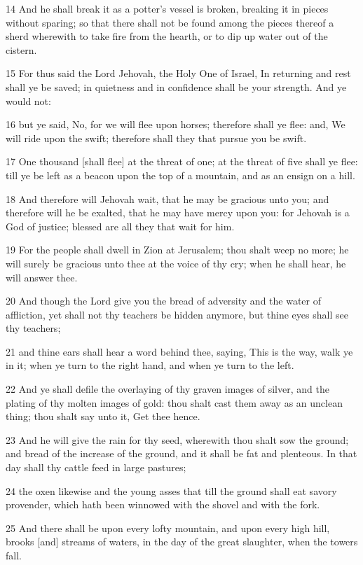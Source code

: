 \par 14 And he shall break it as a potter's vessel is broken, breaking it in pieces without sparing; so that there shall not be found among the pieces thereof a sherd wherewith to take fire from the hearth, or to dip up water out of the cistern.
\par 15 For thus said the Lord Jehovah, the Holy One of Israel, In returning and rest shall ye be saved; in quietness and in confidence shall be your strength. And ye would not:
\par 16 but ye said, No, for we will flee upon horses; therefore shall ye flee: and, We will ride upon the swift; therefore shall they that pursue you be swift.
\par 17 One thousand [shall flee] at the threat of one; at the threat of five shall ye flee: till ye be left as a beacon upon the top of a mountain, and as an ensign on a hill.
\par 18 And therefore will Jehovah wait, that he may be gracious unto you; and therefore will he be exalted, that he may have mercy upon you: for Jehovah is a God of justice; blessed are all they that wait for him.
\par 19 For the people shall dwell in Zion at Jerusalem; thou shalt weep no more; he will surely be gracious unto thee at the voice of thy cry; when he shall hear, he will answer thee.
\par 20 And though the Lord give you the bread of adversity and the water of affliction, yet shall not thy teachers be hidden anymore, but thine eyes shall see thy teachers;
\par 21 and thine ears shall hear a word behind thee, saying, This is the way, walk ye in it; when ye turn to the right hand, and when ye turn to the left.
\par 22 And ye shall defile the overlaying of thy graven images of silver, and the plating of thy molten images of gold: thou shalt cast them away as an unclean thing; thou shalt say unto it, Get thee hence.
\par 23 And he will give the rain for thy seed, wherewith thou shalt sow the ground; and bread of the increase of the ground, and it shall be fat and plenteous. In that day shall thy cattle feed in large pastures;
\par 24 the oxen likewise and the young asses that till the ground shall eat savory provender, which hath been winnowed with the shovel and with the fork.
\par 25 And there shall be upon every lofty mountain, and upon every high hill, brooks [and] streams of waters, in the day of the great slaughter, when the towers fall.

